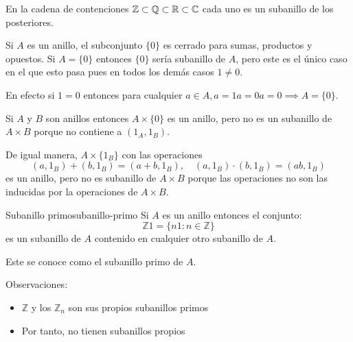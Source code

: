 \begin{example}{}{}
    En la cadena de contenciones $\mathbb{Z} \subset \mathbb{Q} \subset \mathbb{R} \subset \mathbb{C}$ cada uno es un subanillo de los posteriores.
\end{example}

\begin{example}{}{}
    Si $A$ es un anillo, el subconjunto $\{0\}$ es cerrado para sumas, productos y opuestos. Si $A = \{0\}$ entonces $\{0\}$ sería subanillo de $A$, pero este es el único caso en el que esto pasa pues en todos los demás casos $1 \neq 0$.

    En efecto si $1=0$ entonces para cualquier $a \in A, a = 1a = 0a = 0 \implies A = \{0\}$.
\end{example}

\begin{example}{}{}
    Si $A$ y $B$ son anillos entonces $A \times \{0\}$ es un anillo, pero no es un subanillo de $A \times B$ porque no contiene a $(1_A, 1_B)$.

    De igual manera, $A \times \{1_B\}$ con las operaciones
    \[
    (a,1_B) + (b, 1_B) = (a+b, 1_B), \quad (a,1_B )\cdot (b, 1_B) = (ab, 1_B)
    \]
    es un anillo, pero no es subanillo de $A \times B$ porque las operaciones no son las inducidas por la operaciones de $A \times B$.
\end{example}

\begin{example}{Subanillo primo}{subanillo-primo}
    Si \(A\) es un anillo entonces el conjunto:
    \[
    \mathbb{Z}1 = \{n1 : n \in \mathbb{Z}\}
    \]
    es un subanillo de \(A\) contenido en cualquier otro subanillo de \(A\). 
    
    Este se conoce como el subanillo primo de \(A\). 
    
    Observaciones:
    \begin{itemize}
        \item \(\mathbb{Z}\) y los \(\mathbb{Z}_n\) son sus propios subanillos primos
        \item Por tanto, no tienen subanillos propios
    \end{itemize}
\end{example}

